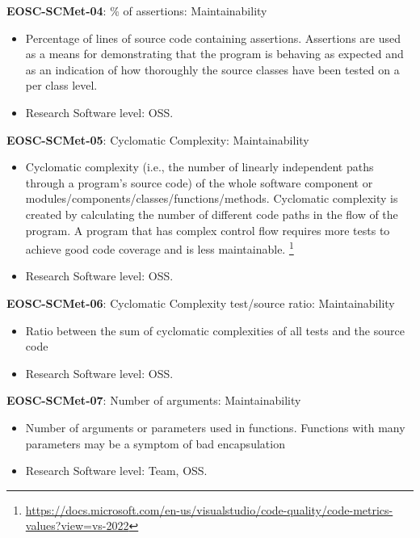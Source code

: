 \textbf{EOSC-SCMet-04}: \% of assertions: Maintainability

\begin{itemize}
    \item Percentage of lines of source code containing assertions. Assertions are used as a means for demonstrating that the program is behaving as expected and as an indication of how thoroughly the source classes have been tested on a per class level. \cite{nagappan_early_2005}
    \item Research Software level: OSS.
\end{itemize}

\textbf{EOSC-SCMet-05}: Cyclomatic Complexity: Maintainability

\begin{itemize}
    \item Cyclomatic complexity (i.e.,  the number of linearly independent paths through a program's source code) of the whole software component or modules/components/classes/functions/methods. Cyclomatic complexity is created by calculating the number of different code paths in the flow of the program. A program that has complex control flow requires more tests to achieve good code coverage and is less maintainable. \footnote{\url{https://docs.microsoft.com/en-us/visualstudio/code-quality/code-metrics-values?view=vs-2022}} \cite{srisopha_software_2018,montagud_systematic_2012,baggen_standardized_2012,nagappan_early_2005}
    \item Research Software level: OSS.
\end{itemize}

\textbf{EOSC-SCMet-06}: Cyclomatic Complexity test/source ratio: Maintainability

\begin{itemize}
    \item Ratio between the sum of cyclomatic complexities of all tests and the source code \cite{nagappan_early_2005}
    \item Research Software level: OSS.
\end{itemize}

\textbf{EOSC-SCMet-07}: Number of arguments: Maintainability

\begin{itemize}
    \item Number of arguments or parameters used in functions. Functions with many parameters may be a symptom of bad encapsulation \cite{baggen_standardized_2012,ogasawara_experiences_1996}
    \item Research Software level: Team, OSS.
\end{itemize}

